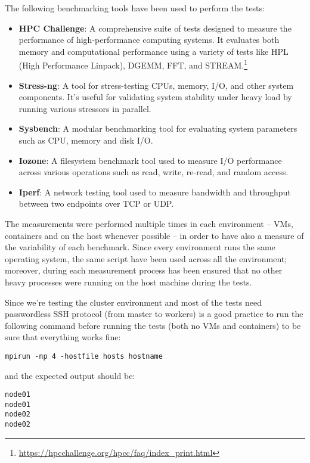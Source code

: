 The following benchmarking tools have been used to perform the tests:

\begin{itemize}
    \item \textbf{HPC Challenge}: A comprehensive suite of tests designed to measure the performance of high-performance computing systems. It evaluates both memory and computational performance using a variety of tests like HPL (High Performance Linpack), DGEMM, FFT, and STREAM.\footnote{\url{https://hpcchallenge.org/hpcc/faq/index_print.html}}
    \item \textbf{Stress-ng}: A tool for stress-testing CPUs, memory, I/O, and other system components. It's useful for validating system stability under heavy load by running various stressors in parallel.
    \item \textbf{Sysbench}: A modular benchmarking tool for evaluating system parameters such as CPU, memory and disk I/O.
    \item \textbf{Iozone}: A filesystem benchmark tool used to measure I/O performance across various operations such as read, write, re-read, and random access.
    \item \textbf{Iperf}: A network testing tool used to measure bandwidth and throughput between two endpoints over TCP or UDP. 
\end{itemize}

The measurements were performed multiple times in each environment -- VMs, containers and on the host whenever possible --  in order to have also a measure of the variability of each benchmark. Since every environment runs the same operating system, the same script have been used across all the environment; moreover, during each measurement process has been ensured that no other heavy processes were running on the host machine during the tests.\\

\par Since we're testing the cluster environment and most of the tests need passwordless SSH protocol (from master to workers) is a good practice to run the following command before running the tests (both no VMs and containers) to be sure that everything works fine:

\begin{verbatim}
mpirun -np 4 -hostfile hosts hostname
\end{verbatim}

and the expected output should be:

\begin{verbatim}
node01
node01
node02
node02
\end{verbatim}

